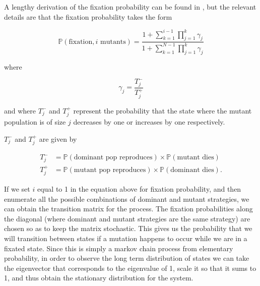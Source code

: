 A lengthy derivation of the fixation probability can be found in \cite{traulsenhauert}, but the relevant details are that the fixation probability takes the form

\begin{equation*}
    \mathbb{P}(\text{fixation}, i \text{ mutants}) = \frac{1 + \sum_{k = 1}^{i - 1}{\prod_{j = 1}^{k}{\gamma_j}}}{1 + \sum_{k = 1}^{N - 1}{\prod_{j = 1}^{k}{\gamma_j}}}
\end{equation*}

where

\begin{equation*}
    \gamma_j = \frac{T_j^-}{T_j^+}
\end{equation*}

and where $T_j^-$ and $T_j^+$ represent the probability that the state where the mutant population is of size $j$ decreases by one or increases by one respectively.

$T_j^-$ and $T_j^+$ are given by

\begin{align*}
    T_j^- & = \mathbb{P}(\text{dominant pop reproduces}) \times \mathbb{P}(\text{mutant dies}) \\
    T_j^+ & = \mathbb{P}(\text{mutant pop reproduces}) \times \mathbb{P}(\text{dominant dies}).
\end{align*}
 
If we set $i$ equal to 1 in the equation above for fixation probability, and then enumerate all the possible combinations of dominant and mutant strategies, we can obtain the transition matrix for the process.
The fixation probabilities along the diagonal (where dominant and mutant strategies are the same strategy) are chosen so as to keep the matrix stochastic.
This gives us the probability that we will transition between states if a mutation happens to occur while we are in a fixated state.
Since this is simply a markov chain process from elementary probability, in order to observe the long term distribution of states we can take the eigenvector that corresponds to the eigenvalue of 1, scale it so that it sums to 1, and thus obtain the stationary distribution for the system.


